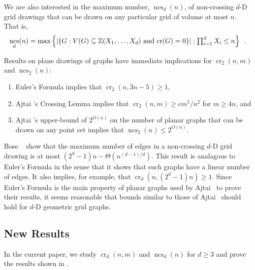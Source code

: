 \documentclass{patmorin}
\DeclareMathOperator{\crs}{cr}
\DeclareMathOperator{\ncs}{ncs}
\begin{document}
We are also interested in the maximum number, $\ncs_d(n)$, of non-crossing
$d$-D grid drawings that can be drawn on any particular grid
of volume at most $n$.  That is,
\[
  \ncs_d(n) = \max\left\{
     \left|\left\{G:\mbox{$V(G)\subseteq\Z(X_1,\ldots,X_d)$
            and $\crs(G)=0$} \right\}\right| :
    \mbox{$\prod_{i=1}^d X_i \le n$} \right\} \enspace .
\]

Results on plane drawings of graphs have immediate implications
for $\crs_2(n,m)$ and $\ncs_2(n)$:
\begin{enumerate}
  \item  Euler's Formula implies that $\crs_2(n,3n-5)\ge 1$,
  \item  Ajtai \etal's Crossing Lemma implies that $\crs_2(n,m)\ge
  cm^3/n^2$ for $m\ge 4n$, and
  \item  Ajtai \etal's upper-bound of $2^{O(n)}$ on the number of planar
  graphs that can be drawn on any point set implies that $\ncs_2(n)\le
  2^{O(n)}$.
\end{enumerate}

Bose \etal~\cite{bose.czyzowicz.ea:maximum} show that the maximum
number of edges in a non-crossing $d$-D grid drawing is at most
$(2^d-1)n-\Theta(n^{(d-1)/d})$. This result is analagous to Euler's
Formula in the sense that it shows that such graphs have a linear number
of edges.  It also implies, for example, that $\crs_d(n,(2^d-1)n)\ge 1$.
Since Euler's Formula is the main property of planar graphs used by Ajtai
\etal\ to prove their results, it seems reasonable that bounds similar
to those of Ajtai \etal\ should hold for $d$-D geometric grid graphs.

\subsection{New Results}

In the current paper, we study $\crs_d(n,m)$ and $\ncs_d(n)$ for $d\ge 3$
and prove the results shown in .

\end{document}
